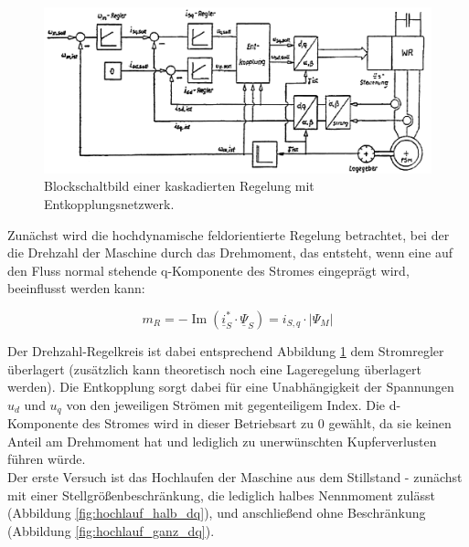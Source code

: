 \begin{figure}[h!]
    \centering
    \includegraphics[scale=0.4]{1/Regelung.png}
    \caption{Blockschaltbild einer kaskadierten Regelung mit Entkopplungsnetzwerk.}
    \label{fig:regelkreis}
\end{figure}

\noindent Zunächst wird die hochdynamische feldorientierte Regelung betrachtet, bei der die Drehzahl der Maschine durch das Drehmoment, das entsteht, wenn eine auf den Fluss normal stehende q-Komponente des Stromes eingeprägt wird, beeinflusst werden kann:

\begin{equation}
    m_R=-\operatorname{Im}(\underline{i}_S^* \cdot \underline{\Psi}_S)= i_{S,q} \cdot |\Psi_M|
\end{equation}

\noindent Der Drehzahl-Regelkreis ist dabei entsprechend Abbildung \ref{fig:regelkreis} dem Stromregler überlagert (zusätzlich kann theoretisch noch eine Lageregelung überlagert werden). Die Entkopplung sorgt dabei für eine Unabhängigkeit der Spannungen $u_d$ und $u_q$ von den jeweiligen Strömen mit gegenteiligem Index. Die d-Komponente des Stromes wird in dieser Betriebsart zu 0 gewählt, da sie keinen Anteil am Drehmoment hat und lediglich zu unerwünschten Kupferverlusten führen würde.\\
\noindent Der erste Versuch ist das Hochlaufen der Maschine aus dem Stillstand - zunächst mit einer Stellgrößenbeschränkung, die lediglich halbes Nennmoment zulässt (Abbildung \ref{fig:hochlauf_halb_dq}), und anschließend ohne Beschränkung (Abbildung \ref{fig:hochlauf_ganz_dq}). 






